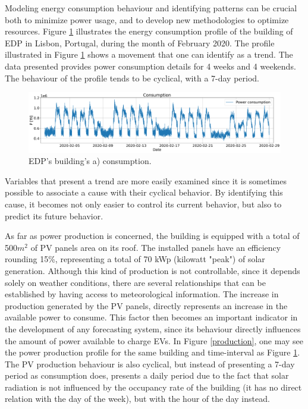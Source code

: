 Modeling energy consumption behaviour and identifying patterns can be crucial both to minimize power usage, and to develop new methodologies to optimize resources. Figure \ref{consumption} illustrates the energy consumption profile of the building of \ac{EDP} in Lisbon, Portugal, during the month of February 2020. The profile illustrated in Figure \ref{consumption} shows a movement that one can identify as a trend. The data presented provides power consumption details for 4 weeks and 4 weekends. The behaviour of the profile tends to be cyclical, with a 7-day period. 
\begin{figure}[h!]
    \centering
    \begin{center}
    \includegraphics[width=1\textwidth]{Images/power_consumption.png}
    \caption{EDP's building's a) consumption.}
    \label{consumption}
    \end{center}
\end{figure}


Variables that present a trend are more easily examined since it is sometimes possible to associate a cause with their cyclical behavior. By identifying this cause, it becomes not only easier to control its current behavior, but also to predict its future behavior. 

As far as power production is concerned, the building is equipped with a total of 500$m^2$ of \ac{PV} panels area on its roof. The installed panels have an efficiency rounding 15\%, representing a total of 70 kWp (kilowatt "peak") of solar generation. Although this kind of production is not controllable, since it depends solely on weather conditions, there are several relationships that can be established by having access to meteorological information. The increase in production generated by the \ac{PV} panels, directly represents an increase in the available power to consume. This factor then becomes an important indicator in the development of any forecasting system, since its behaviour directly influences the amount of power available to charge \ac{EV}s. In Figure \ref{production}, one may see the power production profile for the same building and time-interval as Figure \ref{consumption}. The \ac{PV} production behaviour is also cyclical, but instead of presenting a 7-day period as consumption does, presents a daily period due to the fact that solar radiation is not influenced by the occupancy rate of the building (it has no direct relation with the day of the week), but with the hour of the day instead.

